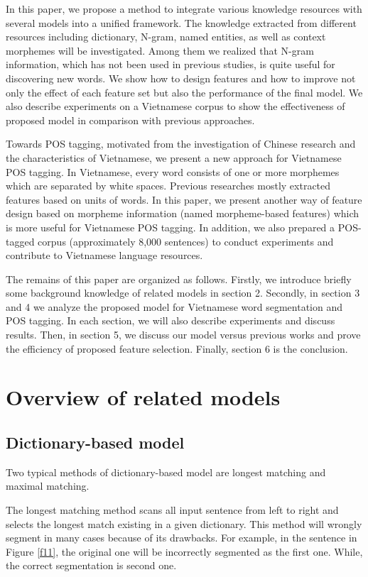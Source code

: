 \documentclass[english]{jnlp_1.4}
\begin{document}
In this paper, we propose a method to integrate various knowledge resources with several models into a unified framework. The knowledge extracted from different resources including dictionary, N-gram,
named entities, as well as context morphemes will be investigated. Among them we realized that
N-gram information, which has not been used in previous studies, is quite useful for discovering new words.
We show how to design features and how to improve not only the effect of each feature set
but also the performance of the final model. We also describe experiments on a Vietnamese corpus
to show the effectiveness of proposed model in comparison with previous approaches.

Towards POS tagging, motivated from the investigation of Chinese research \cite{Ng_Low04} and the characteristics of Vietnamese, we present a new approach for Vietnamese POS tagging.
In Vietnamese, every word consists of one or more morphemes which are separated by white spaces. Previous researches mostly extracted features based on units of words. In this paper, we present another way of feature design based on morpheme information (named morpheme-based features) which is more useful for Vietnamese POS tagging.
In addition, we also prepared a POS-tagged corpus (approximately 8,000 sentences) to conduct experiments and
contribute to Vietnamese language resources.

The remains of this paper are organized as follows. Firstly, we introduce briefly some background knowledge of
related models in section 2. Secondly, in section 3 and 4 we analyze the proposed model for Vietnamese word segmentation and
POS tagging. In each section, we will also describe experiments and discuss results. Then, in section 5, we discuss
our model versus previous works and prove the efficiency of proposed feature selection. Finally, section 6 is the conclusion.



\section{Overview of related models}

\subsection{Dictionary-based model}
Two typical methods of dictionary-based model are longest matching and
maximal matching.

The longest matching method scans all input sentence from left to right
and selects the longest match existing in a given
dictionary. This method will wrongly segment in
many cases because of its drawbacks. For example,
in the sentence in Figure \ref{f11}, the original one will be incorrectly segmented as the first one.
While, the correct segmentation is second one.
\end{document}
